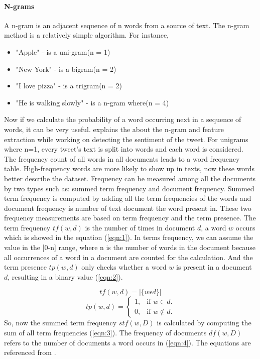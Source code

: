 \paragraph{N-grams} 


A n-gram is an adjacent sequence of n words from a source of text. The n-gram method is a relatively simple algorithm. For instance, 
\begin{itemize}
  \item "Apple" - is a uni-gram(n = 1)
  \item "New York" - is a bigram(n = 2)
  \item "I love pizza" - is a trigram(n = 2)
  \item "He is walking slowly" - is a n-gram where(n = 4)
\end{itemize}
Now if we calculate the probability of a word occurring next in a sequence of words, it can be very useful. \cite{groot2012data} explains the about the n-gram and feature extraction while working on detecting the sentiment of the tweet. For unigrams where n=1, every tweet's text is split into words and each word is considered. The frequency count of all words in all documents leads to a word frequency table. High-frequency words are more likely to show up in texts, now these words better describe the dataset. Frequency can be measured among all the documents by two types such as: summed term frequency and document frequency. Summed term frequency is computed by adding all the term frequencies of the words and document frequency is number of text document the word present in. These two frequency measurements are based on term frequency and the term presence. The term frequency $tf(w,d)$ is the number of times in document $d$, a word $w$ occurs which is showed in the equation (\ref{eqn:1}). In terms frequency, we can assume the value in the [0-n] range, where n is the number of words in the document because all occurrences of a word in a document are counted for the calculation. And the term presence $tp(w,d)$ only checks whether a word $w$ is present in a document $d$, resulting in a binary value (\ref{eqn:2}).

\begin{equation}
\label{eqn:1}
tf(w,d) = |\{w \epsilon d\}|
\end{equation}
\begin{equation}
\label{eqn:2}
  tp(w,d)=\begin{cases}
    1, & \text{if $w \in d$}.\\
    0, & \text{if $w \not\in d$}.
  \end{cases}
\end{equation}
So, now the summed term frequency $stf(w,D)$ is calculated by computing the sum of all term frequencies (\ref{eqn:3}). The frequency of documents $df(w,D)$ refers to the number of documents a word occurs in (\ref{eqn:4}). The equations are referenced from \cite{groot2012data}.

